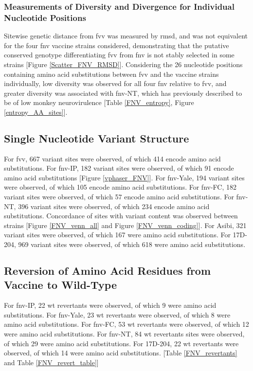 \subsubsection{Measurements of Diversity and Divergence for Individual Nucleotide Positions}
Sitewise genetic distance from \gls{fvv} was measured by \gls{rmsd}, and was not equivalent for the four \gls{fnv} vaccine strains considered, demonstrating that the putative conserved genotype differentiating \gls{fvv} from \gls{fnv} is not stably selected in some strains  [Figure \ref{Scatter_FNV_RMSD}]. Considering the 26 nucleotide positions containing amino acid substitutions between \gls{fvv} and the vaccine strains individually, low diversity was observed for all four \gls{fnv} relative to \gls{fvv}, and greater diversity was associated with \gls{fnv}-NT, which has previously described to be of low monkey neurovirulence [Table \ref{FNV_entropy}, Figure \ref{entropy_AA_sites}].


\subsection{Single Nucleotide Variant Structure}
For \gls{fvv}, 667 variant sites were observed, of which 414 encode amino acid substitutions. For \gls{fnv}-IP, 182 variant sites were observed, of which 91 encode amino acid substitutions [Figure \ref{vphaser_FNV}]. For \gls{fnv}-Yale, 194 variant sites were observed, of which 105 encode amino acid substitutions. For \gls{fnv}-FC, 182 variant sites were observed, of which 57 encode amino acid substitutions. For \gls{fnv}-NT, 396 variant sites were observed, of which 234 encode amino acid substitutions. Concordance of sites with variant content was observed between strains [Figure \ref{FNV_venn_all} and Figure \ref{FNV_venn_coding}]. For Asibi, 321 variant sites were observed, of which 167 were amino acid substitutions. For 17D-204, 969 variant sites were observed, of which 618 were amino acid substitutions. 

\subsection{Reversion of Amino Acid Residues from Vaccine to Wild-Type}
For \gls{fnv}-IP, 22 \gls{wt} revertants were observed, of which 9 were amino acid substitutions. For \gls{fnv}-Yale, 23 \gls{wt} revertants were observed, of which 8 were amino acid substitutions. For \gls{fnv}-FC, 53 \gls{wt} revertants were observed, of which 12 were amino acid substitutions. For \gls{fnv}-NT, 84 \gls{wt} revertants sites were observed, of which 29 were amino acid substitutions. For 17D-204, 22 \gls{wt} revertants were observed, of which 14 were amino acid substitutions. [Table \ref{FNV_revertants} and Table \ref{FNV_revert_table}]

